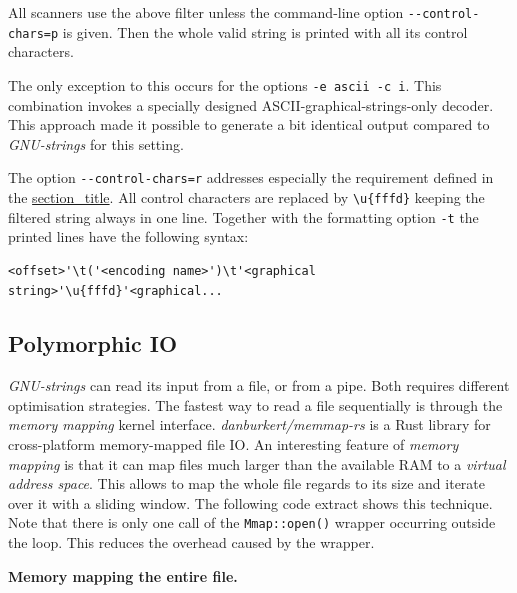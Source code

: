 All scanners use the above filter unless the command-line option
\texttt{-\/-control-chars=p} is given. Then the whole valid string is
printed with all its control characters.

The only exception to this occurs for the options
\texttt{-e\ ascii\ -c\ i}. This combination invokes a specially designed
ASCII-graphical-strings-only decoder. This approach made it possible to
generate a bit identical output compared to \emph{GNU-strings} for this
setting.

The option \texttt{-\/-control-chars=r} addresses especially the
requirement defined in the
\protect\hyperlink{req-post-treatment}{section\_title}. All control
characters are replaced by \texttt{\textbackslash{}u\{fffd\}} keeping
the filtered string always in one line. Together with the formatting
option \texttt{-t} the printed lines have the following syntax:

\begin{verbatim}
<offset>'\t('<encoding name>')\t'<graphical string>'\u{fffd}'<graphical...
\end{verbatim}

\hypertarget{_polymorphic_io}{\subsection{Polymorphic
IO}\label{_polymorphic_io}}

\emph{GNU-strings} can read its input from a file, or from a pipe. Both
requires different optimisation strategies. The fastest way to read a
file sequentially is through the \emph{memory mapping} kernel interface.
\emph{danburkert/memmap-rs} is a Rust library for cross-platform
memory-mapped file IO. An interesting feature of \emph{memory mapping}
is that it can map files much larger than the available RAM to a
\emph{virtual address space}. This allows to map the whole file regards
to its size and iterate over it with a sliding window. The following
code extract shows this technique. Note that there is only one call of
the \texttt{Mmap::open()} wrapper occurring outside the loop. This
reduces the overhead caused by the wrapper.

\textbf{Memory mapping the entire file.}

\begin{Shaded}
\begin{Highlighting}[]
   \NormalTok{= }\NormalTok{;}
 
  
 
  
\NormalTok{\}}
\end{Highlighting}
\end{Shaded}

